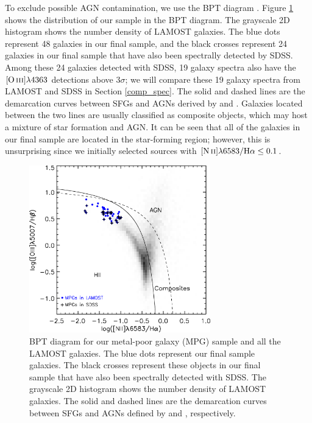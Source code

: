 \documentclass[usenatbib]{raa}
\begin{document}
 To exclude  possible AGN contamination, we use the BPT diagram
 \citep[see][]{1981PASP...93..817B,1987ApJS...63..295V,
 2001ApJ...556..121K,2003MNRAS.341...33K}. 
Figure \ref{bpt} shows the distribution of our sample  in the BPT diagram.
The grayscale 2D histogram shows the number density of LAMOST galaxies.
The blue dots represent 48 galaxies in our final sample, and the black crosses 
represent 24 galaxies in our final sample that have also been
spectrally detected by SDSS. Among these 24 galaxies detected with SDSS, 
19 galaxy spectra also have the $\hbox{[O\,{\sc iii}]}\lambda4363$ detections above 3$\sigma$; 
 we will compare these 19 galaxy spectra from LAMOST and SDSS in Section 
\ref{comp_spec}. 
The solid and dashed lines are the demarcation curves between SFGs and AGNs 
derived by 
 \cite{2003MNRAS.341...33K} and \cite{2001ApJ...556..121K}. 
 Galaxies located between the two lines are usually classified as composite
 objects, which may host a mixture of star formation and AGN.  
 It can be seen that all of the galaxies in our final sample are located in the 
 star-forming region; however, this is unsurprising since we initially selected 
sources
 with $\hbox{[N\,{\sc ii}]}\lambda6583/\hbox{H$\alpha$} \le 0.1$. 
 
\begin{figure}
\centering
\includegraphics[width=0.7\textwidth]{fig2.eps}
\caption{ BPT diagram for our metal-poor galaxy (MPG) sample and all the 
LAMOST galaxies.  
The blue 
dots represent our final sample galaxies.    
The black crosses represent these objects in our final sample that have also 
been
spectrally detected with SDSS. The
grayscale 2D histogram shows the number density of LAMOST galaxies.
The solid and dashed lines are the demarcation curves between SFGs and AGNs 
defined by \cite{2003MNRAS.341...33K} and \cite{2001ApJ...556..121K}, 
respectively.}
\label{bpt}
\end{figure}
 
\end{document}
